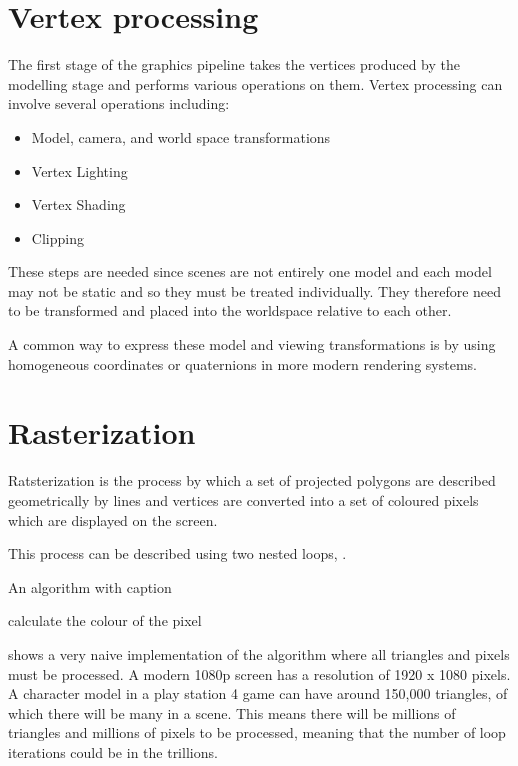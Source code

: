 \section{Vertex processing}
The first stage of the graphics pipeline takes the vertices produced by the modelling stage and performs various operations on them.
Vertex processing can involve several operations including:
\begin{itemize}
    \item Model, camera, and world space transformations
    \item Vertex Lighting
    \item Vertex Shading
    \item Clipping
\end{itemize} 

These steps are needed since scenes are not entirely one model and each model may not be static and so they must be treated individually. They therefore need to be transformed and placed into the worldspace relative to each other. 

A common way to express these model and viewing transformations is by using homogeneous coordinates\cite{homoCoord} or quaternions\cite{quaternions} in more modern rendering systems.

\section{Rasterization}
Ratsterization is the process by which a set of projected polygons are described geometrically by lines and vertices are converted into a set of coloured pixels which are displayed on the screen\cite{ScratchPixelRasterStage}.

This process can be described using two nested loops, .
\begin{algorithm}
\caption{An algorithm with caption}\label{algorithm:rasterizationPseudocode}
\begin{algorithmic}
 
     
            \State calculate the colour of the pixel
        \EndIf
    \EndFor
\EndFor
\end{algorithmic}
\end{algorithm}

 shows a very naive implementation of the algorithm where all triangles and pixels must be processed. A modern 1080p screen has a resolution of 1920 x 1080 pixels. A character model in a play station 4 game can have around 150,000 triangles, of which there will be many in a scene. This means there will be millions of triangles and millions of pixels to be processed, meaning that the number of loop iterations could be in the trillions.

